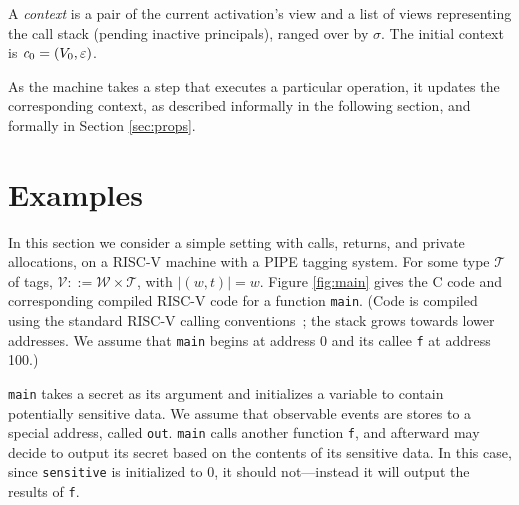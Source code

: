 \documentclass[10pt,conference]{ieeetran}%
\theoremstyle{definition}
\begin{document}
A {\it context} is a pair of the current activation's view and 
a list of views representing the call stack (pending inactive
principals), ranged over by \(\sigma\).  
The initial context is \(\mathit{c}_0 = (V_0, \varepsilon)\).

As the machine takes a step that executes a particular operation, it updates the
corresponding context, as described informally in the following section, and formally
in Section \ref{sec:props}.

\section{Examples}

In this section we consider a simple setting with calls, returns, and private allocations,
on a RISC-V machine with a PIPE tagging system. For some type \(\mathcal{T}\) of tags,
\(\mathcal{V} ::= \mathcal{W} \times \mathcal{T}\), with \(|(w,t)| = w\).
Figure \ref{fig:main} gives the C code and corresponding compiled RISC-V code
for a function {\tt main}. (Code is compiled using the standard RISC-V
calling conventions~\cite{??}; the stack grows towards lower addresses. We assume that
{\tt main} begins at address 0 and its callee {\tt f} at address 100.)

{\tt main} takes a secret as its argument and initializes a variable to contain
potentially sensitive data. We assume that observable events are stores
to a special address, called {\tt out}. 
{\tt main} calls another function {\tt f},
and afterward may decide to output its secret based on the contents of
its sensitive data. In this case, since {\tt sensitive} is initialized to 0,
it should not---instead it will output the results of {\tt f}.
\end{document}
